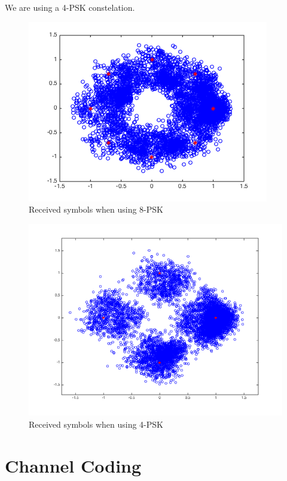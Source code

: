 \documentclass{article}
\begin{document}
We are using a 4-PSK constelation. 

\begin{figure}
  \centering\includegraphics[width=\textwidth]{../presentation/8psk.png}
  \caption{Received symbols when using 8-PSK}
  \label{fig:8psk}
\end{figure}

\begin{figure}
  \centering\includegraphics[width=\textwidth]{../presentation/4psk.png}
  \caption{Received symbols when using 4-PSK}
  \label{fig:4psk}
\end{figure}

\section{Channel Coding}
\end{document}
